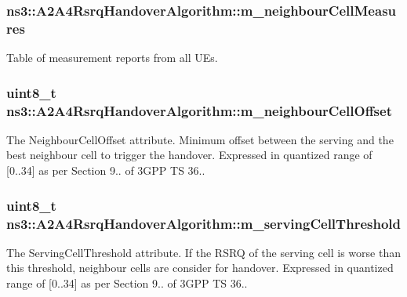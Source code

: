\subsubsection[{\texorpdfstring{m\+\_\+neighbour\+Cell\+Measures}{m_neighbourCellMeasures}}]{ ns3\+::\+A2\+A4\+Rsrq\+Handover\+Algorithm\+::m\+\_\+neighbour\+Cell\+Measures\hspace{0.3cm}{\ttfamily [private]}}\hypertarget{classns3_1_1A2A4RsrqHandoverAlgorithm_ab02d6372aec766c1d6e7611111456fa4}{}\label{classns3_1_1A2A4RsrqHandoverAlgorithm_ab02d6372aec766c1d6e7611111456fa4}


Table of measurement reports from all U\+Es. 

\subsubsection[{\texorpdfstring{m\+\_\+neighbour\+Cell\+Offset}{m_neighbourCellOffset}}]{\setlength{\rightskip}{0pt plus 5cm}uint8\+\_\+t ns3\+::\+A2\+A4\+Rsrq\+Handover\+Algorithm\+::m\+\_\+neighbour\+Cell\+Offset\hspace{0.3cm}{\ttfamily [private]}}\hypertarget{classns3_1_1A2A4RsrqHandoverAlgorithm_afe15ce0bd178565ef3f42d83ada4428b}{}\label{classns3_1_1A2A4RsrqHandoverAlgorithm_afe15ce0bd178565ef3f42d83ada4428b}
The {\ttfamily Neighbour\+Cell\+Offset} attribute. Minimum offset between the serving and the best neighbour cell to trigger the handover. Expressed in quantized range of \mbox{[}0..34\mbox{]} as per Section 9.. of 3\+G\+PP TS 36.. 
\subsubsection[{\texorpdfstring{m\+\_\+serving\+Cell\+Threshold}{m_servingCellThreshold}}]{\setlength{\rightskip}{0pt plus 5cm}uint8\+\_\+t ns3\+::\+A2\+A4\+Rsrq\+Handover\+Algorithm\+::m\+\_\+serving\+Cell\+Threshold\hspace{0.3cm}{\ttfamily [private]}}\hypertarget{classns3_1_1A2A4RsrqHandoverAlgorithm_acb5609bb57548a7cd9fe92fbef4dd99b}{}\label{classns3_1_1A2A4RsrqHandoverAlgorithm_acb5609bb57548a7cd9fe92fbef4dd99b}
The {\ttfamily Serving\+Cell\+Threshold} attribute. If the R\+S\+RQ of the serving cell is worse than this threshold, neighbour cells are consider for handover. Expressed in quantized range of \mbox{[}0..34\mbox{]} as per Section 9.. of 3\+G\+PP TS 36.. 

